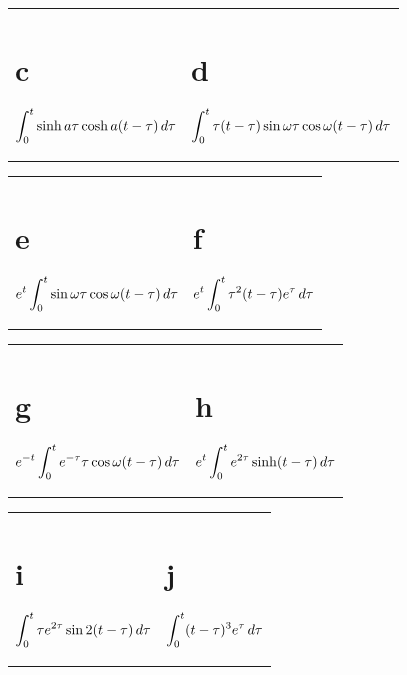 \begin{exerciselist}
\begin{description}
    \item
      \begin{tabular}[t]{@{}p{168pt}@{}p{168pt}}
        \part{c} $\displaystyle{\int_{0}^{t}\sinh a\tau\cosh a(t-\tau)\,d\tau}$ & \part{d} $\displaystyle{\int_{0}^{t}\tau(t-\tau)\sin\omega\tau\cos\omega (t-\tau)\,d\tau}$
      \end{tabular}

    \item
      \begin{tabular}[t]{@{}p{168pt}@{}p{168pt}}
        \part{e} $\displaystyle{e^{t}\int_{0}^{t}\sin\omega\tau \cos\omega(t-\tau)\,d\tau}$ & \part{f} $\displaystyle{e^{t}\int_{0}^{t}\tau^{2}(t-\tau)e^{\tau}\,d\tau}$
      \end{tabular}

    \item
      \begin{tabular}[t]{@{}p{168pt}@{}p{168pt}}
        \part{g} $\displaystyle{e^{-t}\int_{0}^{t}e^{-\tau}\tau\cos\omega(t-\tau)\,d\tau}$ & \part{h} $\displaystyle{e^{t}\int_{0}^{t}e^{2\tau}\sinh (t-\tau)\,d\tau}$
      \end{tabular}

    \item
      \begin{tabular}[t]{@{}p{168pt}@{}p{168pt}}
        \part{i} $\displaystyle{\int_{0}^{t}\tau e^{2\tau}\sin 2(t-\tau)\,d\tau}$ & \part{j} $\displaystyle{\int_{0}^{t}(t-\tau)^{3}e^{\tau}\,d\tau}$
      \end{tabular}


\end{description}
\end{exerciselist}
